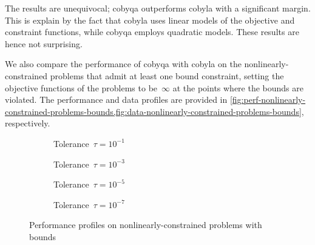 The results are unequivocal; \gls{cobyqa} outperforms \gls{cobyla} with a significant margin.
This is explain by the fact that \gls{cobyla} uses linear models of the objective and constraint functions, while \gls{cobyqa} employs quadratic models.
These results are hence not surprising.

We also compare the performance of \gls{cobyqa} with \gls{cobyla} on the nonlinearly-constrained problems that admit at least one bound constraint, setting the objective functions of the problems to be~$\infty$ at the points where the bounds are violated.
The performance and data profiles are provided in \cref{fig:perf-nonlinearly-constrained-problems-bounds,fig:data-nonlinearly-constrained-problems-bounds}, respectively.

\begin{figure}[ht]
    \centering
    \begin{subfigure}[b]{0.49\textwidth}
        \centering
        \caption{Tolerance~$\tau = 10^{-1}$}
    \end{subfigure}
    \hfill
    \begin{subfigure}[b]{0.49\textwidth}
        \centering
        \caption{Tolerance~$\tau = 10^{-3}$}
    \end{subfigure}
    \begin{subfigure}[b]{0.49\textwidth}
        \centering
        \caption{Tolerance~$\tau = 10^{-5}$}
    \end{subfigure}
    \hfill
    \begin{subfigure}[b]{0.49\textwidth}
        \centering
        \caption{Tolerance~$\tau = 10^{-7}$}
    \end{subfigure}
    \caption{Performance profiles on nonlinearly-constrained problems with bounds}
    \label{fig:perf-nonlinearly-constrained-problems-bounds}
\end{figure}

